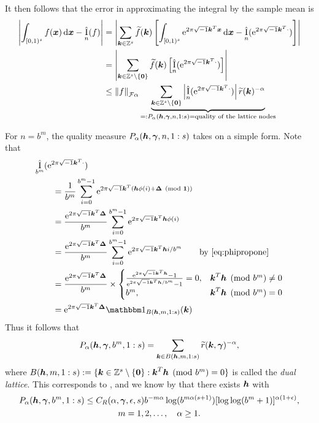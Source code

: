 \documentclass{amsart}
\newcommand{\tr}{\widetilde{r}}
\newcommand{\appxintn}{\appxint_n}
\DeclareMathOperator{\appxint}{\hat{I}}
\begin{document}
It then follows that the error in approximating the integral by the sample mean is
\begin{align} \label{eq:wcerrPalpha}
\abs{\int_{[0,1)^{s}} f(\vx) \, \dif \vx - \appxint_n(f)} &
= \abs{\sum_{\vk \in \integers^{s}} \tf(\vk) \left[\int_{[0,1)^{s}} \me^{2 \pi \sqrt{-1} \vk^T \vx} \, \dif \vx - \appxintn(\me^{2 \pi \sqrt{-1} \vk^T \cdot})\right]} \\
\nonumber
& = \abs{\sum_{\vk \in \integers^s \setminus\{\vzero\}} \tf(\vk) \left[ \appxintn(\me^{2 \pi \sqrt{-1} \vk^T \cdot})\right]} \\
\nonumber
& \le \norm[\cf{\alpha}]{f} \underbrace{\sum_{\vk \in \integers^s \setminus\{\vzero\}} \abs{\appxint_n(\me^{2 \pi \sqrt{-1} \vk^T \cdot})}\tr(\vk)^{-\alpha}}_{=: P_\alpha(\vh,\vgamma,n,1:s) = \text{quality of the lattice nodes}}  %
\nonumber
\end{align}

For $n = b^m$, the quality measure $P_\alpha(\boldsymbol{h},\boldsymbol{\gamma},n,1:s)$ takes on a simple form.  Note that
\begin{align}\label{Eq:DualLattice}
    \MoveEqLeft{\appxint_{b^m}(\me^{2 \pi \sqrt{-1} \vk^T \cdot})} \\
    \nonumber
    &= \frac 1{b^m} \sum_{i=0}^{b^m-1} \me^{2 \pi \sqrt{-1} \vk^T (\vh\phi(i) + \vDelta \pmod{\vone})} \\
    \nonumber
    &= \frac {\me^{2 \pi \sqrt{-1} \vk^T \vDelta}}{b^m} \sum_{i=0}^{b^m-1} \me^{2 \pi \sqrt{-1} \vk^T \vh\phi(i)} \\
    \nonumber
    &= \frac {\me^{2 \pi \sqrt{-1} \vk^T \vDelta}}{b^m} \sum_{i=0}^{b^m-1} \me^{2 \pi \sqrt{-1} \vk^T \vh i/b^m} \qquad \text{by \eqref{eq:phipropone}}\\
    \nonumber
    &= \frac {\me^{2 \pi \sqrt{-1} \vk^T \vDelta}}{b^m} \times
    \begin{cases}
    \frac{\me^{2 \pi \sqrt{-1} \vk^T \vh} - 1}{\me^{2 \pi \sqrt{-1} \vk^T \vh/b^m} - 1} = 0, & \vk^T \vh \pmod{b^m} \ne 0\\
    b^m, & \vk^T \vh \pmod{b^m} = 0
    \end{cases} \\
    \nonumber
    & = \me^{2 \pi \sqrt{-1} \vk^T \vDelta} \bbone_{B(\vh,m,1:s)}(\vk)
\end{align}
Thus it follows that
\begin{equation} \label{eq:Palphadual}
    P_\alpha(\vh,\vgamma,b^m,1:s) = \sum_{\vk \in B(\vh,m,1:s)} \tr(\vk,\vgamma)^{-\alpha},
\end{equation}
where $B(\boldsymbol{h},m,1:s) : = \{\boldsymbol{k} \in  \mathbb{Z}^s \setminus \{\boldsymbol{0}\} : \boldsymbol{k}^T \boldsymbol{h} \pmod{b^m} = 0\}$ is called the \emph{dual lattice}.  This corresponds to \cite[Equation (3)]{HicNie03a}, and we know by \cite[Theorem 5]{HicNie03a} that  there exists $\boldsymbol{h}$ with
\begin{multline} \label{eq:Niedbd}
    P_{\alpha}(\boldsymbol{h},\boldsymbol{\gamma},b^m,1:s) \le C_{R}(\alpha,\boldsymbol{\gamma},\epsilon,s)
    b^{-m\alpha} \log(b^{m\alpha(s+1)}) [\log \log (
    b^m+1)]^{\alpha(1+\epsilon)}, \\ m = 1, 2,\ldots, \quad \alpha \ge 1.
\end{multline}
\end{document}
